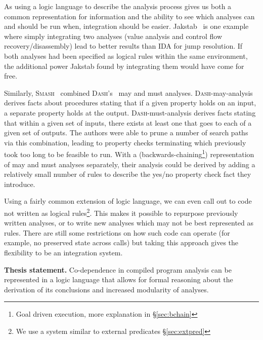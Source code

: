 As using a logic language to describe the analysis process gives us both a common representation for information and the ability to see which analyses can and should be run when, integration should be easier.
Jakstab~\cite{jakstab} is one example where simply integrating two analyses (value analysis and control flow recovery/disassembly) lead to better results than IDA\cite{ida} for jump resolution.
If both analyses had been specified as logical rules within the same environment, the additional power Jakstab found by integrating them would have come for free.

Similarly, \textsc{Smash}~\cite{smash} combined \textsc{Dash}'s~\cite{dash} may and must analyses.
\textsc{Dash}-may-analysis derives facts about procedures stating that if a given property holds on an input, a separate property holds at the output.
\textsc{Dash}-must-analysis derives facts stating that within a given set of inputs, there exists at least one that goes to each of a given set of outputs.
The authors were able to prune a number of search paths via this combination, leading to property checks terminating which previously took too long to be feasible to run.
With a (backwards-chaining\footnote{Goal driven execution, more explanation in \S\ref{sec:bchain}}) representation of may and must analyses separately, their analysis could be derived by adding a relatively small number of rules to describe the yes/no property check fact they introduce.

Using a fairly common extension of logic language, we can even call out to code not written as logical rules\footnote{We use a system similar to external predicates \S\ref{sec:extpred}}.
This makes it possible to repurpose previously written analyses, or to write new analyses which may not be best represented as rules.
There are still some restrictions on how such code can operate (for example, no preserved state across calls) but taking this approach gives the flexibility to be an integration system.

\begin{inset}
{\bf Thesis statement.}
Co-dependence in compiled program analysis can be represented in a logic language that allows for formal reasoning about the derivation of its conclusions and increased modularity of analyses.
\end{inset}

